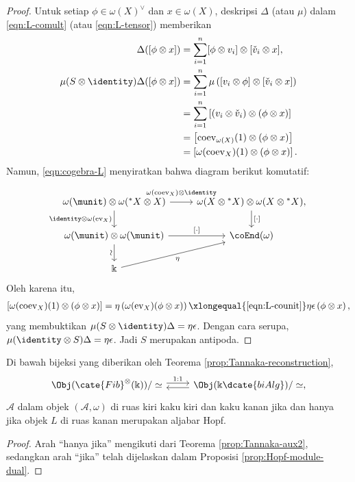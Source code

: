 \begin{proof}
	Untuk setiap $\phi \in \omega(X)^\vee$ dan $x \in \omega(X)$, deskripsi
	$\Delta$ (atau $\mu$) dalam \eqref{eqn:L-comult} (atau
	\eqref{eqn:L-tensor}) memberikan
	\begin{align*}
		\Delta([\phi \otimes x]) & = \sum_{i=1}^n [\phi \otimes v_i] \otimes [\check{v}_i \otimes x], \\
		\mu(S \otimes \identity)\Delta([\phi \otimes x]) & = \sum_{i=1}^n \mu\left( [v_i \otimes \phi] \otimes [\check{v}_i \otimes x] \right) \\
		& = \sum_{i=1}^n \left[ (v_i \otimes \check{v}_i) \otimes (\phi \otimes x) \right] \\
		& = \left[ \mathrm{coev}_{\omega(X)}(1) \otimes (\phi \otimes x) \right] \\
		& = \left[ \omega(\mathrm{coev}_X)(1) \otimes (\phi \otimes x) \right].
	\end{align*}
	Namun, \eqref{eqn:cogebra-L} menyiratkan bahwa diagram berikut komutatif:
	\[\begin{tikzcd}
		\omega(\munit) \otimes \omega({}^* X \otimes X) \arrow[r, "{\omega(\mathrm{coev}_X) \otimes \identity}" inner sep=0.6em] \arrow[d, "{\identity \otimes \omega(\mathrm{ev}_X)}"'] & \omega(X \otimes {}^* X) \otimes \omega(X \otimes {}^* X), \arrow[d, "{[\cdot]}"] \\
		\omega(\munit) \otimes \omega(\munit) \arrow[d, "\sim"' sloped] \arrow[r, "{[\cdot]}"] & \coEnd(\omega) \\
		\Bbbk \arrow[ru, "\eta"'] & 
	\end{tikzcd}\]
	Oleh karena itu,
	\begin{gather*}
		\left[ \omega(\mathrm{coev}_X)(1) \otimes (\phi \otimes x) \right]
		= \eta\left( \omega(\mathrm{ev}_X)(\phi \otimes x) \right)
		\xlongequal{\text{\eqref{eqn:L-counit}}} \eta\epsilon\left( \phi \otimes x \right),
	\end{gather*}
	yang membuktikan $\mu(S \otimes \identity)\Delta = \eta\epsilon$.
	Dengan cara serupa,
	$\mu(\identity \otimes S)\Delta = \eta\epsilon$. Jadi $S$ merupakan
	antipoda.
\end{proof}

\begin{corollary}\label{prop:Hopf-vs-dual}
	Di bawah bijeksi yang diberikan oleh Teorema
	\ref{prop:Tannaka-reconstruction},
	\[\begin{tikzcd}
		\Obj(\cate{Fib}^{\otimes}(\Bbbk))/\simeq \arrow[shift left, r, "{1:1}"] & \Obj(\Bbbk\dcate{biAlg}) /\simeq , \arrow[shift left, l]
	\end{tikzcd}\]
	$\mathcal{A}$ dalam objek $(\mathcal{A}, \omega)$ di ruas kiri kaku
	kiri dan kaku kanan jika dan hanya jika objek $L$ di ruas kanan merupakan
	aljabar Hopf.
\end{corollary}
\begin{proof}
	Arah ``hanya jika'' mengikuti dari Teorema \ref{prop:Tannaka-aux2},
	sedangkan arah ``jika'' telah dijelaskan dalam Proposisi
	\ref{prop:Hopf-module-dual}.
\end{proof}

